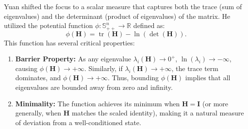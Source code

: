 \documentclass[12pt,a4paper]{article}  %
\theoremstyle{definition}
\numberwithin{equation}{section}
\DeclareMathOperator{\tr}{tr}
\newcommand{\RR}{\mathbb{R}}
\begin{document}
Yuan shifted the focus to a scalar measure that captures both the trace (sum of eigenvalues) and the determinant (product of eigenvalues) of the matrix. He utilized the potential function $\phi: \mathbb{S}_{++}^n \to \RR$ defined as:
\begin{equation}
    \phi(\mathbf{H}) = \tr(\mathbf{H}) - \ln(\det(\mathbf{H})).
    \label{eq:potential_func}
\end{equation}
This function has several critical properties:
\begin{enumerate}
    \item \textbf{Barrier Property:} As any eigenvalue $\lambda_i(\mathbf{H}) \to 0^+$, $\ln(\lambda_i) \to -\infty$, causing $\phi(\mathbf{H}) \to +\infty$. Similarly, if $\lambda_i(\mathbf{H}) \to +\infty$, the trace term dominates, and $\phi(\mathbf{H}) \to +\infty$. Thus, bounding $\phi(\mathbf{H})$ implies that all eigenvalues are bounded away from zero and infinity.
    \item \textbf{Minimality:} The function achieves its minimum when $\mathbf{H} = \mathbf{I}$ (or more generally, when $\mathbf{H}$ matches the scaled identity), making it a natural measure of deviation from a well-conditioned state.
\end{enumerate}
\end{document}
